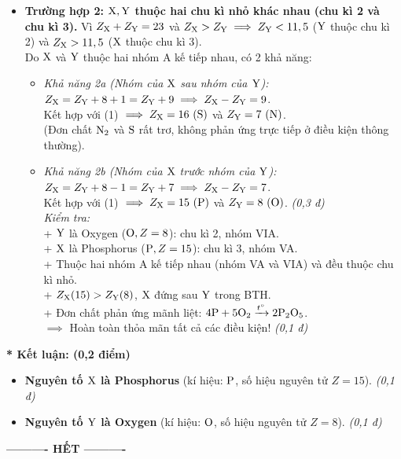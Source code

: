 \documentclass[11pt,a4paper]{article}
\begin{document}
\begin{tcolorbox}[colback=white,colframe=solBlue,title=\textbf{Lời giải chi tiết và Biểu điểm Câu 3:}]
\begin{itemize}[leftmargin=1.2cm]
\item \textbf{Trường hợp 2: $\ce{X, Y}$ thuộc hai chu kì nhỏ khác nhau (chu kì 2 và chu kì 3).}
  Vì $Z_{\ce{X}} + Z_{\ce{Y}} = 23$ và $Z_{\ce{X}} > Z_{\ce{Y}} \implies Z_{\ce{Y}} < 11,5$ ($\ce{Y}$ thuộc chu kì 2) và $Z_{\ce{X}} > 11,5$ ($\ce{X}$ thuộc chu kì 3).\\
  Do $\ce{X}$ và $\ce{Y}$ thuộc hai nhóm A kế tiếp nhau, có 2 khả năng:
  \begin{itemize}
  \item \textit{Khả năng 2a (Nhóm của $\ce{X}$ sau nhóm của $\ce{Y}$):}
    $Z_{\ce{X}} = Z_{\ce{Y}} + 8 + 1 = Z_{\ce{Y}} + 9 \implies Z_{\ce{X}} - Z_{\ce{Y}} = 9$.\\
    Kết hợp với (1) $\implies Z_{\ce{X}} = 16\ (\ce{S})$ và $Z_{\ce{Y}} = 7\ (\ce{N})$.\\
    (Đơn chất $\ce{N2}$ và $\ce{S}$ rất trơ, không phản ứng trực tiếp ở điều kiện thông thường).
  \item \textit{Khả năng 2b (Nhóm của $\ce{X}$ trước nhóm của $\ce{Y}$):}
    $Z_{\ce{X}} = Z_{\ce{Y}} + 8 - 1 = Z_{\ce{Y}} + 7 \implies Z_{\ce{X}} - Z_{\ce{Y}} = 7$.\\
    Kết hợp với (1) $\implies Z_{\ce{X}} = 15\ (\ce{P})$ và $Z_{\ce{Y}} = 8\ (\ce{O})$. \hfill \textit{(0,3 đ)}\\
    \textit{Kiểm tra:}\\
    + $\ce{Y}$ là Oxygen ($\ce{O}, Z=8$): chu kì 2, nhóm VIA.\\
    + $\ce{X}$ là Phosphorus ($\ce{P}, Z=15$): chu kì 3, nhóm VA.\\
    + Thuộc hai nhóm A kế tiếp nhau (nhóm VA và VIA) và đều thuộc chu kì nhỏ.\\
    + $Z_{\ce{X}} (15) > Z_{\ce{Y}} (8)$, $\ce{X}$ đứng sau $\ce{Y}$ trong BTH.\\
    + Đơn chất phản ứng mãnh liệt: $4\ce{P} + 5\ce{O2} \xrightarrow{t^\circ} 2\ce{P2O5}$.\\
    $\implies$ Hoàn toàn thỏa mãn tất cả các điều kiện! \hfill \textit{(0,1 đ)}
  \end{itemize}
\end{itemize}

\textbf{* Kết luận: (0,2 điểm)}
\begin{itemize}[leftmargin=1.2cm]
\item \textbf{Nguyên tố $\ce{X}$ là Phosphorus} (kí hiệu: $\ce{P}$, số hiệu nguyên tử $Z = 15$). \hfill \textit{(0,1 đ)}
\item \textbf{Nguyên tố $\ce{Y}$ là Oxygen} (kí hiệu: $\ce{O}$, số hiệu nguyên tử $Z = 8$). \hfill \textit{(0,1 đ)}
\end{itemize}
\end{tcolorbox}

\vspace{6pt}
\begin{center}
\textbf{\large ---------- HẾT ----------}
\end{center}
\end{document}
